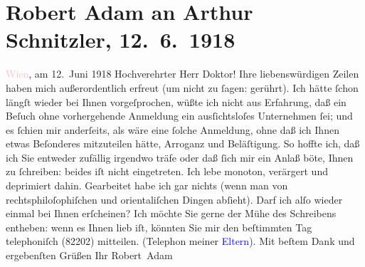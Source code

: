 

               \section[Robert Adam an Arthur Schnitzler, 12. 6. 1918]{ Robert Adam an Arthur Schnitzler, 12. 6. 1918}\nopagebreak{}\rehead{ }\normalsize\beginnumbering{} \toendnotes[C]{\smallbreak\pagebreak[2]} 
\toendnotes[C]{\smallbreak}\pstart
           \raggedleft{}{\pb}\textcolor{pink}{Wien}{}\ledrightnote{\textcolor{pink}{Wien}}, am 12. Juni 1918\pend
           \pstart\center{}Hochverehrter Herr Doktor!\pend\pstart
           Ihre liebenswürdigen Zeilen haben mich außerordentlich erfreut (um nicht zu
                    ſagen: gerührt). Ich hätte ſchon längſt wieder bei Ihnen vorgeſprochen, wüßte
                    ich nicht aus Erfahrung, daß ein Beſuch ohne vorhergehende Anmeldung ein
                    ausſichtsloſes Unternehmen ſei; und es ſchien mir anderſeits, als wäre eine
                    ſolche Anmeldung, ohne daß ich Ihnen etwas Beſonderes mitzuteilen hätte,
                    Arroganz und Beläſtigung. So hoffte ich, daß ich Sie entweder zufällig irgendwo
                    träfe oder daß ſich mir ein Anlaß böte, Ihnen zu ſchreiben: beides iſt nicht
                    eingetreten.\pend
           \pstart
           Ich lebe monoton, verärgert und {\pb}deprimiert dahin. Gearbeitet habe ich gar nichts (wenn man von
                    rechtsphiloſophiſchen und orientaliſchen Dingen abſieht).\pend
           \pstart
           Darf ich alſo wieder einmal bei Ihnen erſcheinen? Ich möchte Sie gerne der Mühe
                    des Schreibens entheben: wenn es Ihnen lieb iſt, könnten Sie mir den beſtimmten
                    Tag telephoniſch (82202) mitteilen. (Telephon meiner \textcolor{blue}{Eltern}{}).\pend
           \pstart
           Mit beſtem Dank und ergebenſten Grüßen Ihr\pend
           \pstart \spacefill\mbox{Robert Adam}\pend{}\endnumbering{}  
      